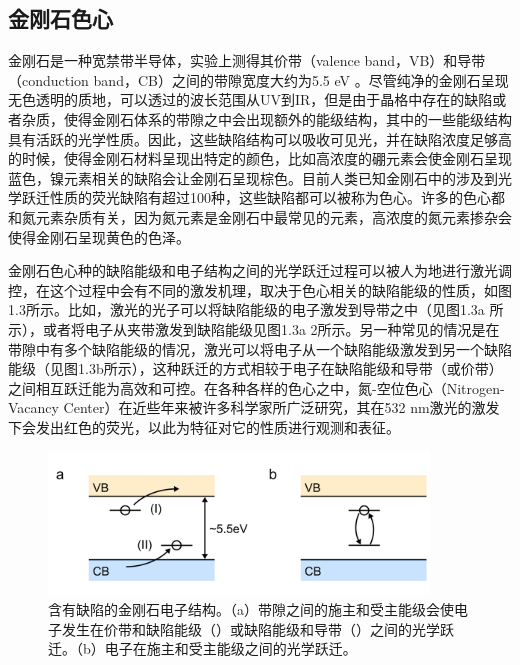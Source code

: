 \documentclass[type = bachelor]{whu-thesis}
\begin{document}
\subsection{金刚石色心}
金刚石是一种宽禁带半导体，实验上测得其价带（valence band，VB）和导带（conduction band，CB）之间的带隙宽度大约为5.5 \unit{\eV} \cite{mildren2013optical,cheng2023bandgap,wort2008diamond}。尽管纯净的金刚石呈现无色透明的质地，可以透过的波长范围从UV到IR，但是由于晶格中存在的缺陷或者杂质，使得金刚石体系的带隙之中会出现额外的能级结构，其中的一些能级结构具有活跃的光学性质。因此，这些缺陷结构可以吸收可见光，并在缺陷浓度足够高的时候，使得金刚石材料呈现出特定的颜色，比如高浓度的硼元素会使金刚石呈现蓝色，镍元素相关的缺陷会让金刚石呈现棕色。目前人类已知金刚石中的涉及到光学跃迁性质的荧光缺陷有超过100种，这些缺陷都可以被称为色心\cite{koizumi2008physics,jelezko2006single}。许多的色心都和氮元素杂质有关，因为氮元素是金刚石中最常见的元素，高浓度的氮元素掺杂会使得金刚石呈现黄色的色泽\cite{breeding2020naturally, zaitsev2016spectroscopic}。

金刚石色心种的缺陷能级和电子结构之间的光学跃迁过程可以被人为地进行激光调控，在这个过程中会有不同的激发机理，取决于色心相关的缺陷能级的性质，如图1.3所示。比如，激光的光子可以将缺陷能级的电子激发到导带之中（见图1.3a \uppercase\expandafter{}所示），或者将电子从夹带激发到缺陷能级见图1.3a \uppercase\expandafter{\romannumeral2所示}。另一种常见的情况是在带隙中有多个缺陷能级的情况，激光可以将电子从一个缺陷能级激发到另一个缺陷能级（见图1.3b所示），这种跃迁的方式相较于电子在缺陷能级和导带（或价带）之间相互跃迁能为高效和可控\cite{gali2011time,gali2012excitation}。在各种各样的色心之中，氮-空位色心（Nitrogen-Vacancy Center）在近些年来被许多科学家所广泛研究，其在532 nm激光的激发下会发出红色的荧光，以此为特征对它的性质进行观测和表征\cite{doherty2013nitrogen}。

\begin{figure}
  \centering
  \includegraphics[width=0.9\textwidth]{figures/Chapter 1/Optical Transition.png}
  \caption{含有缺陷的金刚石电子结构。（a）带隙之间的施主和受主能级会使电子发生在价带和缺陷能级（\uppercase\expandafter{}）或缺陷能级和导带（\uppercase\expandafter{}）之间的光学跃迁。（b）电子在施主和受主能级之间的光学跃迁。}
  \label{fig:Optical Transition}
\end{figure}
\end{document}
